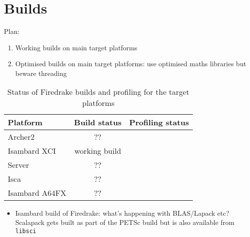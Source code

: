 \documentclass[a4paper,titlepage]{article}
\begin{document}

\section{Builds}

Plan:
\begin{enumerate}
\item Working builds on main target platforms
\item Optimised builds on main target platforms: use optimised maths libraries but beware threading
\end{enumerate}
%

\begin{table}[htp]
\begin{center}
\begin{tabular}{|l|c|c|}
\hline
Platform       &  Build status     & Profiling status \\
\hline
Archer2        &  ??               & \\
Isambard XCI   &  working build    & \\
Server         &  ??               & \\
Isca           &  ??               & \\
Isambard A64FX &  ??               & \\
\hline
\end{tabular}
\end{center}
\caption{Status of Firedrake builds and profiling for the target platforms}
\label{table:build_status}
\end{table}%

\begin{itemize}
\item Isambard build of Firedrake: what's happening with BLAS/Lapack etc? Scalapack gets built as part of the PETSc build but is also available from \texttt{libsci}
\end{itemize}


\end{document}
